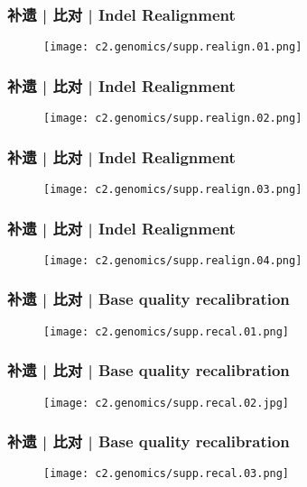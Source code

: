 \begin{frame}
  \frametitle{补遗 | 比对 | Indel Realignment}
  \begin{figure}
    \centering
    \texttt{[image: c2.genomics/supp.realign.01.png]}
  \end{figure}
\end{frame}

\begin{frame}
  \frametitle{补遗 | 比对 | Indel Realignment}
  \begin{figure}
    \centering
    \texttt{[image: c2.genomics/supp.realign.02.png]}
  \end{figure}
\end{frame}

\begin{frame}
  \frametitle{补遗 | 比对 | Indel Realignment}
  \begin{figure}
    \centering
    \texttt{[image: c2.genomics/supp.realign.03.png]}
  \end{figure}
\end{frame}

\begin{frame}
  \frametitle{补遗 | 比对 | Indel Realignment}
  \begin{figure}
    \centering
    \texttt{[image: c2.genomics/supp.realign.04.png]}
  \end{figure}
\end{frame}

\begin{frame}
  \frametitle{补遗 | 比对 | Base quality recalibration}
  \begin{figure}
    \centering
    \texttt{[image: c2.genomics/supp.recal.01.png]}
  \end{figure}
\end{frame}

\begin{frame}
  \frametitle{补遗 | 比对 | Base quality recalibration}
  \begin{figure}
    \centering
    \texttt{[image: c2.genomics/supp.recal.02.jpg]}
  \end{figure}
\end{frame}

\begin{frame}
  \frametitle{补遗 | 比对 | Base quality recalibration}
  \begin{figure}
    \centering
    \texttt{[image: c2.genomics/supp.recal.03.png]}
  \end{figure}
\end{frame}

